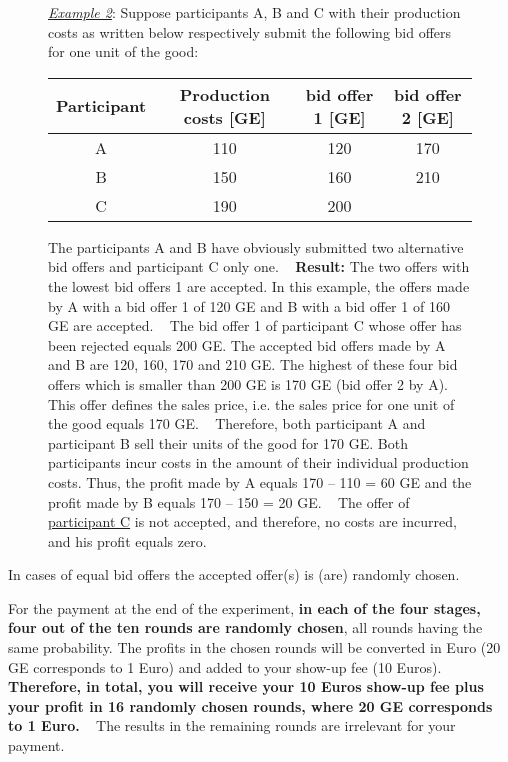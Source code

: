 \documentclass[11pt]{article}
\begin{document}
\begin{figure}[h!] 
	\begin{minipage}[t]{1\linewidth} 
		\begin{tcolorbox}[colback=pink,arc=0pt,colframe=black!25]
			\underline{\textit{Example 2}}: Suppose participants A, B and C with their production costs as written below respectively submit the following bid offers for one unit of the good:
			\begin{center}
				\begin{tabular}{c|ccc}
					Participant & Production costs [GE] & bid offer 1 [GE]	& bid offer 2 [GE] \\
					\hline
					A			& 110				 	& 120 				&	170 \\
					B			& 150	 				& 160				& 	210 \\
					C			& 190					& 200
				\end{tabular} \bigbreak	
			\end{center}	
			The participants A and B have obviously submitted two alternative bid offers and participant C only one.  ~\medbreak
			\textbf{Result:} The two offers with the lowest bid offers 1 are accepted. In this example, the offers made by A with a bid offer 1 of 120 GE and B with a bid offer 1 of 160 GE are accepted. ~\medbreak
			The bid offer 1 of participant C whose offer has been rejected equals 200 GE. The accepted bid offers made by A and B are 120, 160, 170 and 210 GE. The highest of these four bid offers which is smaller than 200 GE is 170 GE (bid offer 2 by A). This offer defines the sales price, i.e. the sales price for one unit of the good equals 170 GE. ~\medbreak
			Therefore, both participant A and participant B sell their units of the good for 170 GE. Both participants incur costs in the amount of their individual production costs. Thus, the profit made by A equals 170 – 110 = 60 GE and the profit made by B equals 170 – 150 = 20 GE. ~\medbreak		
			The offer of \underline{participant C} is not accepted, and therefore, no costs are incurred, and his profit equals zero.   
		\end{tcolorbox} 		
	\end{minipage}  
\end{figure}



In cases of equal bid offers the accepted offer(s) is (are) randomly chosen.



For the payment at the end of the experiment, \textbf{in each of the four stages, four out of the ten rounds are randomly chosen}, all rounds having the same probability. The profits in the chosen rounds will be converted in Euro (20 GE corresponds to 1 Euro) and added to your show-up fee (10 Euros). \textbf{Therefore, in total, you will receive your 10 Euros show-up fee plus your profit in 16 randomly chosen rounds, where 20 GE corresponds to 1 Euro.} ~\bigbreak
The results in the remaining rounds are irrelevant for your payment.
\end{document}

